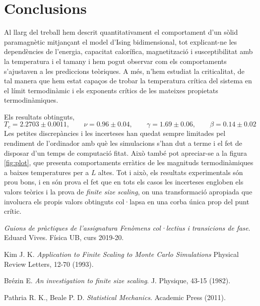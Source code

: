 \documentclass[a4paper]{article}
\begin{document}
\newpage
\section{Conclusions}
Al llarg del treball hem descrit quantitativament el comportament d'un sòlid paramagnètic mitjançant el model d'Ising bidimensional, tot explicant-ne les dependències de l'energia, capacitat calorífica, magnetització i susceptibilitat amb la temperatura i el tamany i hem pogut observar com els comportaments s'ajustaven a les prediccions teòriques. A més, n'hem estudiat la criticalitat, de tal manera que hem estat capaços de trobar la temperatura crítica del sistema en el límit termodinàmic i els exponents crítics de les mateixes propietats termodinàmiques.

Els resultats obtinguts,
\begin{equation*}
    T_c = 2.2703 \pm 0.0011, \qquad \nu = 0.96 \pm 0.04, \qquad \gamma = 1.69 \pm 0.06, \qquad \beta = 0.14 \pm 0.02
\end{equation*}
Les petites discrepàncies i les incerteses han quedat sempre limitades pel rendiment de l'ordinador amb què les simulacions s'han dut a terme i el fet de disposar d'un temps de computació fitat. Això també pot apreciar-se a la figura \ref{fig:plot}, que presenta comportaments erràtics de les magnituds termodinàmiques a baixes temperatures per a $L$ altes. Tot i això, els resultats experimentals són prou bons, i en són prova el fet que en tots els casos les incerteses engloben els valors teòrics i la prova de \textit{finite size scaling}, on una transformació apropiada que involucra els propis valors obtinguts col·lapsa en una corba única prop del punt crític.

\begin{thebibliography}{9}
\textit{Guions de pràctiques de l'assignatura Fenòmens col·lectius i transicions de fase}. Eduard Vives. Física UB, curs 2019-20.

Kim J. K. \textit{Application to Finite Scaling to Monte Carlo Simulations} Physical Review Letters, 12-70 (1993).

Brézin E. \textit{An investigation to finite size scaling}. J. Physique, 43-15 (1982).

Pathria R. K., Beale P. D. \textit{Statistical Mechanics}. Academic Press (2011).

\end{thebibliography}
\end{document}
